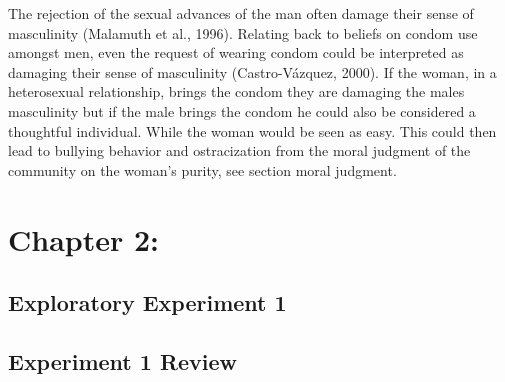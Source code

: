 \documentclass[
  english,
  donotrepeattitle,doc, 12pt, a4paper,floatsintext]{apa7}
\begin{document}
The rejection of the sexual advances of the man often damage their sense of masculinity (Malamuth et al., 1996). Relating back to beliefs on condom use amongst men, even the request of wearing condom could be interpreted as damaging their sense of masculinity (Castro-Vázquez, 2000). If the woman, in a heterosexual relationship, brings the condom they are damaging the males masculinity but if the male brings the condom he could also be considered a thoughtful individual. While the woman would be seen as easy. This could then lead to bullying behavior and ostracization from the moral judgment of the community on the woman's purity, see section moral judgment.
\newpage

\hypertarget{chapter-2}{%
\section{Chapter 2:}\label{chapter-2}}

\hypertarget{exploratory-experiment-1}{%
\subsection{Exploratory Experiment 1}\label{exploratory-experiment-1}}

\hypertarget{experiment-1-review}{%
\subsection{Experiment 1 Review}\label{experiment-1-review}}
\end{document}
